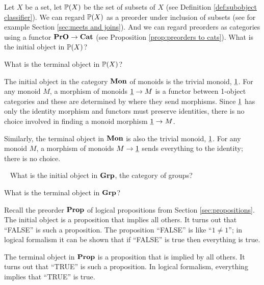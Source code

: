 \documentclass[CT4S-EN-RU]{subfiles}
\begin{document}
\begin{exampleRUS}
\end{exampleRUS}

\begin{exerciseENG}
Let $X$ be a set, let ${\mathbb P}(X)$ be the set of subsets of $X$ (see Definition \ref{def:subobject classifier}). We can regard ${\mathbb P}(X)$ as a preorder under inclusion of subsets (see for example Section \ref{sec:meets and joins}). And we can regard preorders as categories using a functor ${\bf PrO}\rightarrow{\bf Cat}$ (see Proposition \ref{prop:preorders to cats}).
\sexc What is the initial object in ${\mathbb P}(X)$?
\item What is the terminal object in ${\mathbb P}(X)$? 
\endsexc
\end{exerciseENG}

\begin{exerciseRUS}
\end{exerciseRUS}

\begin{exampleENG}\label{ex:initial monoid terminal monoid}
The initial object in the category ${\bf Mon}$ of monoids is the trivial monoid, $\underline{1}$. For any monoid $M$, a morphism of monoids $\underline{1}\rightarrow M$ is a functor between 1-object categories and these are determined by where they send morphisms. Since $\underline{1}$ has only the identity morphism and functors must preserve identities, there is no choice involved in finding a monoid morphism $\underline{1}\rightarrow M$.

Similarly, the terminal object in ${\bf Mon}$ is also the trivial monoid, $\underline{1}$. For any monoid $M$, a morphism of monoids $M\rightarrow\underline{1}$ sends everything to the identity; there is no choice.
\end{exampleENG}

\begin{exampleRUS}\label{ex:initial monoid terminal monoid}
\end{exampleRUS}

\begin{exercise}~
\sexc What is the initial object in ${\bf Grp}$, the category of groups?
\item What is the terminal object in ${\bf Grp}$?
\endsexc
\end{exercise}

\begin{example}
Recall the preorder ${\bf Prop}$ of logical propositions from Section \ref{sec:propositions}. The initial object is a proposition that implies all others. It turns out that “FALSE” is such a proposition. The proposition “FALSE” is like “$1\neq1$”; in logical formalism it can be shown that if “FALSE” is true then everything is true.

The terminal object in ${\bf Prop}$ is a proposition that is implied by all others. It turns out that “TRUE” is such a proposition. In logical formalism, everything implies that “TRUE” is true.
\end{example}
\end{document}
